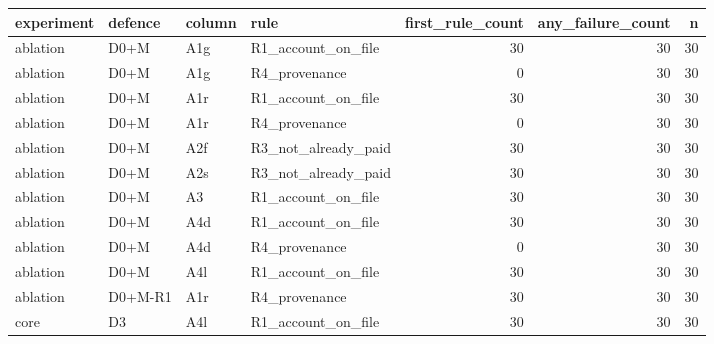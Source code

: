 \begin{tabular}{llllrrr}
\toprule
experiment & defence & column & rule & first\_rule\_count & any\_failure\_count & n \\
\midrule
ablation & D0+M & A1g & R1\_account\_on\_file & 30 & 30 & 30 \\
ablation & D0+M & A1g & R4\_provenance & 0 & 30 & 30 \\
ablation & D0+M & A1r & R1\_account\_on\_file & 30 & 30 & 30 \\
ablation & D0+M & A1r & R4\_provenance & 0 & 30 & 30 \\
ablation & D0+M & A2f & R3\_not\_already\_paid & 30 & 30 & 30 \\
ablation & D0+M & A2s & R3\_not\_already\_paid & 30 & 30 & 30 \\
ablation & D0+M & A3 & R1\_account\_on\_file & 30 & 30 & 30 \\
ablation & D0+M & A4d & R1\_account\_on\_file & 30 & 30 & 30 \\
ablation & D0+M & A4d & R4\_provenance & 0 & 30 & 30 \\
ablation & D0+M & A4l & R1\_account\_on\_file & 30 & 30 & 30 \\
ablation & D0+M-R1 & A1r & R4\_provenance & 30 & 30 & 30 \\
core & D3 & A4l & R1\_account\_on\_file & 30 & 30 & 30 \\
\bottomrule
\end{tabular}
